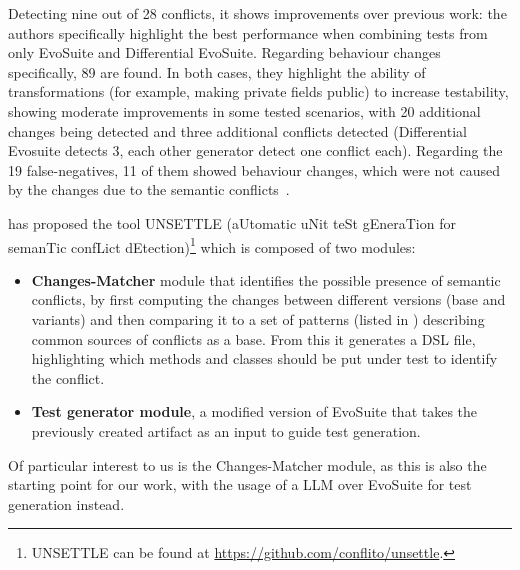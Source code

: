 Detecting nine out of 28 conflicts, it shows improvements over previous work: the authors specifically highlight the best performance when combining tests from only EvoSuite and Differential EvoSuite. Regarding behaviour changes specifically, 89 are found. 
In both cases, they highlight the ability of transformations (for example, making private fields public) to increase testability, showing moderate improvements in some tested scenarios, with 20 additional changes being detected and three additional conflicts detected (Differential Evosuite detects 3, each other generator detect one conflict each).  Regarding the 19 false-negatives, 11 of them showed behaviour changes, which were not caused by the changes due to the semantic conflicts~\cite{kn:leuson2}.


\citet{kn:nuno} has proposed the tool UNSETTLE (aUtomatic uNit teSt gEneraTion for semanTic confLict dEtection)\footnote{UNSETTLE can be found at \url{https://github.com/conflito/unsettle}.} which is composed of two modules:
%
\begin{itemize}
  \item \textbf{Changes-Matcher} module that identifies the possible presence of semantic conflicts, by first computing the changes between different versions (base and variants) and then comparing it to a set of patterns (listed in ) describing common sources of conflicts as a base. From this it generates a DSL file, highlighting which methods and classes should be put under test to identify the conflict.

  \item \textbf{Test generator module}, a modified version of EvoSuite that takes the previously created artifact as an input to guide test generation.
\end{itemize}
%
Of particular interest to us is the Changes-Matcher module, as this is also the starting point for our work, with the usage of a LLM over EvoSuite for test generation instead.

